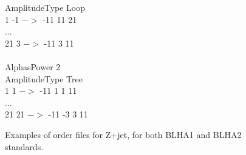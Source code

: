 \begin{figure}[h]
\begin{center}
{{AmplitudeType Loop\\
1 -1 $->$ -11 11 21\\ 
...\\
21 3 $->$ -11 3 11 \\
\\
AlphasPower              2\\
AmplitudeType Tree\\
1 1 $->$ -11 1 1 11\\ 
...\\
21 21 $->$ -11 -3 3 11 \\}}
\caption{Examples of order  files for Z+jet, for both BLHA1 and BLHA2 standards.}
\label{fig:orderLH}
\end{center}
\end{figure}  



